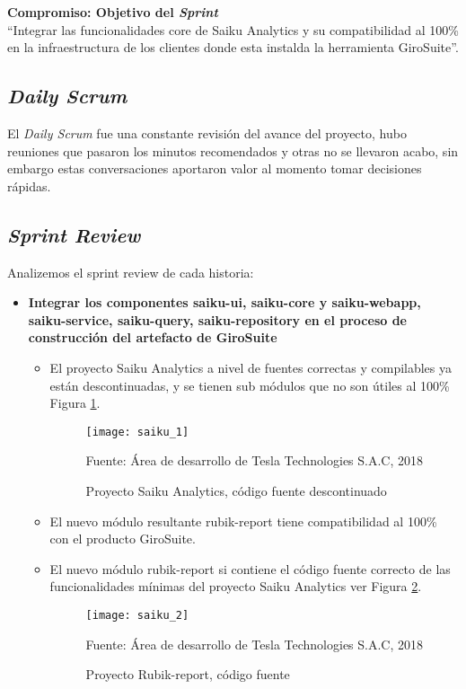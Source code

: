 \begin{spacing}{1.5}
		\textbf{Compromiso: Objetivo del \textit{Sprint}}\\
	``Integrar las funcionalidades core de Saiku Analytics y su compatibilidad al 100\% en la infraestructura de los clientes donde esta instalda la herramienta GiroSuite''.\\
		
	\subsection{\textit{Daily Scrum}}
		El \textit{Daily Scrum} fue una constante revisi\'{o}n del avance del proyecto, hubo reuniones que pasaron los minutos recomendados y otras no se llevaron acabo, sin embargo estas conversaciones aportaron valor al momento tomar decisiones r\'{a}pidas.
	
	\clearpage		
	\subsection{\textit{Sprint Review}}
		Analizemos el sprint review de cada historia:
		
		\begin{itemize}
			\item \textbf{Integrar los componentes saiku-ui, saiku-core y saiku-webapp, saiku-service, saiku-query, saiku-repository en el proceso de construcción del artefacto de GiroSuite}
				\begin{itemize}
					\item El proyecto Saiku Analytics a nivel de fuentes correctas y compilables ya est\'{a}n descontinuadas, y se tienen sub m\'{o}dulos que no son \'{u}tiles al 100\% Figura \ref{figure:chaperIII_4}.
					
					\begin{figure}[H]
						\centering
						\texttt{[image: saiku\_1]}
						\caption {\centering \small{Proyecto Saiku Analytics, c\'{o}digo fuente descontinuado}} \label{figure:chaperIII_4}
						\small {Fuente: \'{A}rea de desarrollo de Tesla Technologies S.A.C, 2018}
					\end{figure}
					\item El nuevo m\'{o}dulo resultante rubik-report tiene compatibilidad al 100\% con el producto GiroSuite.
					\item El nuevo m\'{o}dulo rubik-report si contiene el c\'{o}digo fuente correcto de las funcionalidades m\'{i}nimas del proyecto Saiku Analytics ver Figura \ref{figure:chaperIII_5}.
					
					\begin{figure}[H]
						\centering
						\texttt{[image: saiku\_2]}
						\caption {\centering \small{Proyecto Rubik-report, c\'{o}digo fuente}} \label{figure:chaperIII_5}
						\small {Fuente: \'{A}rea de desarrollo de Tesla Technologies S.A.C, 2018}
					\end{figure}
					

\end{itemize}
\end{itemize}
\end{spacing}
